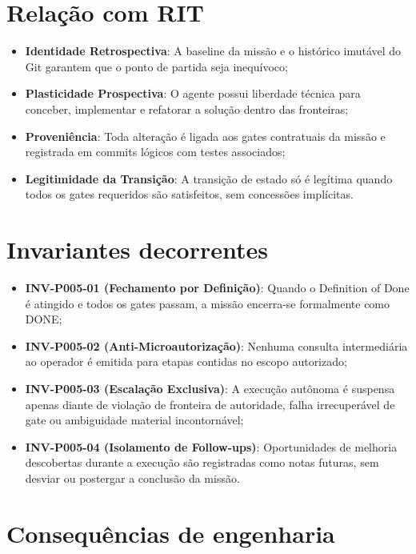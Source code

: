 \section{Relação com RIT}

\begin{itemize}
  \item \textbf{Identidade Retrospectiva}: A baseline da missão e o histórico
    imutável do Git garantem que o ponto de partida seja inequívoco;
  \item \textbf{Plasticidade Prospectiva}: O agente possui liberdade técnica
    para conceber, implementar e refatorar a solução dentro das fronteiras;
  \item \textbf{Proveniência}: Toda alteração é ligada aos gates contratuais da
    missão e registrada em commits lógicos com testes associados;
  \item \textbf{Legitimidade da Transição}: A transição de estado só é legítima
    quando todos os gates requeridos são satisfeitos, sem concessões implícitas.
\end{itemize}

\section{Invariantes decorrentes}

\begin{itemize}
  \item \textbf{INV-P005-01 (Fechamento por Definição)}: Quando o Definition of
    Done é atingido e todos os gates passam, a missão encerra-se formalmente
    como DONE;
  \item \textbf{INV-P005-02 (Anti-Microautorização)}: Nenhuma consulta intermediária
    ao operador é emitida para etapas contidas no escopo autorizado;
  \item \textbf{INV-P005-03 (Escalação Exclusiva)}: A execução autônoma é suspensa
    apenas diante de violação de fronteira de autoridade, falha irrecuperável de
    gate ou ambiguidade material incontornável;
  \item \textbf{INV-P005-04 (Isolamento de Follow-ups)}: Oportunidades de
    melhoria descobertas durante a execução são registradas como notas
    futuras, sem desviar ou postergar a conclusão da missão.
\end{itemize}

\section{Consequências de engenharia}

